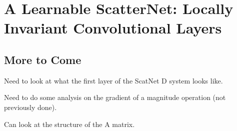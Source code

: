 \chapter{A Learnable ScatterNet: Locally Invariant Convolutional Layers}

\def \path {invariantlayer/}
\def \imgpath {invariantlayer/images}


% 






\section{More to Come}
Need to look at what the first layer of the ScatNet D system looks like.

Need to do some analysis on the gradient of a magnitude operation (not
previously done).

Can look at the structure of the A matrix.

